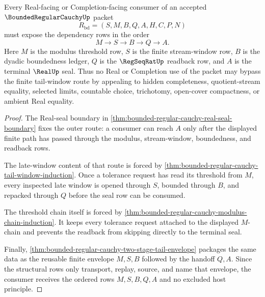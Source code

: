 \begin{theorem}
\label{thm:bounded-regular-cauchy-tail-window-dependency}
Every Real-facing or Completion-facing consumer of an accepted $\BoundedRegularCauchyUp$ packet
$$
R_{\mathrm{bd}}=(S,M,B,Q,A,H,C,P,N)
$$
must expose the dependency rows in the order
$$
M \longrightarrow S \longrightarrow B \longrightarrow Q \longrightarrow A .
$$
Here $M$ is the modulus threshold row, $S$ is the finite stream-window row, $B$ is the dyadic boundedness ledger, $Q$ is the $\RegSeqRatUp$ readback row, and $A$ is the terminal $\RealUp$ seal. Thus no Real or Completion use of the packet may bypass the finite tail-window route by appealing to hidden completeness, quotient-stream equality, selected limits, countable choice, trichotomy, open-cover compactness, or ambient Real equality.
\end{theorem}
\begin{proof}
The Real-seal boundary in \autoref{thm:bounded-regular-cauchy-real-seal-boundary} fixes the outer route: a consumer can reach $A$ only after the displayed finite path has passed through the modulus, stream-window, boundedness, and readback rows.

The late-window content of that route is forced by \autoref{thm:bounded-regular-cauchy-tail-window-induction}. Once a tolerance request has read its threshold from $M$, every inspected late window is opened through $S$, bounded through $B$, and repacked through $Q$ before the seal row can be consumed.

The threshold chain itself is forced by \autoref{thm:bounded-regular-cauchy-modulus-chain-induction}. It keeps every tolerance request attached to the displayed $M$-chain and prevents the readback from skipping directly to the terminal seal.

Finally, \autoref{thm:bounded-regular-cauchy-two-stage-tail-envelope} packages the same data as the reusable finite envelope $M,S,B$ followed by the handoff $Q,A$. Since the structural rows only transport, replay, source, and name that envelope, the consumer receives the ordered rows $M,S,B,Q,A$ and no excluded host principle.
\end{proof}


